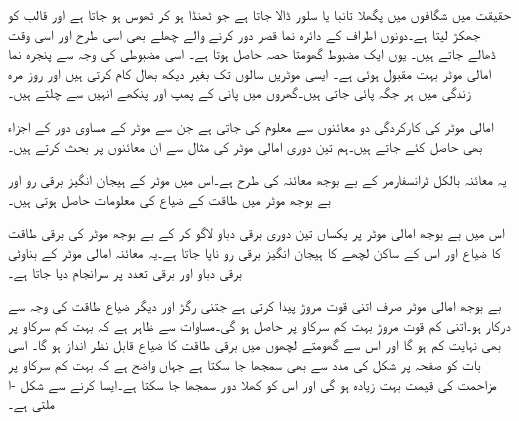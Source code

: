حقیقت میں شگافوں میں پگھلا تانبا یا سلور  ڈالا جاتا ہے جو ٹھنڈا ہو کر ٹھوس ہو جاتا ہے اور قالب کو جھکڑ لیتا ہے۔دونوں اطراف کے دائرہ نما قصر دور کرنے والے چھلے بھی اسی طرح اور اسی وقت ڈھالے جاتے ہیں۔  یوں ایک مضبوط گھومتا حصہ حاصل ہوتا ہے۔ اسی مضبوطی کی وجہ سے  پنجرہ نما امالی موٹر بہت مقبول ہوئی ہے۔ ایسی موٹریں سالوں تک بغیر دیکھ بھال  کام کرتی ہیں اور روز مرہ  زندگی میں ہر جگہ پائی جاتی ہیں۔گھروں میں پانی کے پمپ اور پنکھے انہیں سے چلتے ہیں۔

امالی موٹر کی کارکردگی دو معائنوں سے معلوم کی جاتی ہے جن سے موٹر کے مساوی  دور کے اجزاء  بھی حاصل کئے جاتے ہیں۔ہم تین دوری امالی موٹر کی مثال سے ان معائنوں پر بحث کرتے ہیں۔

یہ معائنہ بالکل ٹرانسفارمر کے بے بوجھ معائنہ کی طرح ہے۔اس میں موٹر کے ہیجان انگیز برقی رو اور بے بوجھ موٹر میں طاقت کے ضیاع کی معلومات حاصل ہوتی ہیں۔ 

اس میں  بے بوجھ امالی موٹر پر یکساں تین دوری  برقی دباو  لاگو کر کے بے بوجھ موٹر کی برقی طاقت کا ضیاع  اور اس کے ساکن لچھے  کا ہیجان انگیز برقی رو  ناپا جاتا ہے۔یہ معائنہ امالی موٹر کے بناوٹی برقی دباو اور برقی تعدد پر سرانجام دیا جاتا ہے۔

بے بوجھ امالی موٹر صرف اتنی قوت مروڑ پیدا کرتی ہے جتنی رگڑ اور دیگر ضیاع طاقت کی وجہ سے درکار ہو۔اتنی کم قوت مروڑ بہت کم سرکاو پر حاصل ہو گی۔مساوات   سے ظاہر ہے کہ بہت کم سرکاو پر   بھی نہایت کم ہو گا  اور اس سے گھومتے لچھوں میں برقی طاقت کا ضیاع قابل نظر انداز ہو گا۔ اسی بات کو صفحہ  پر شکل   کی مدد سے بھی سمجھا جا سکتا ہے جہاں  واضح ہے کہ بہت کم سرکاو پر مزاحمت  کی قیمت بہت زیادہ ہو گی اور اس کو کھلا دور سمجھا جا سکتا ہے۔ایسا کرنے سے شکل -ا ملتی ہے۔


